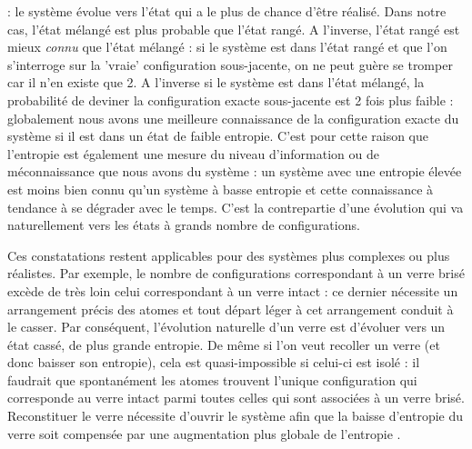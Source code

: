  : le système évolue vers l'état qui a le plus de chance d'être réalisé. Dans notre cas, l'état mélangé est plus probable que l'état rangé. A l'inverse, l'état rangé est mieux \textit{connu} que l'état mélangé : si le système est dans l'état rangé et que l'on s'interroge sur la 'vraie' configuration sous-jacente, on ne peut guère se tromper car il n'en existe que 2. A l'inverse si le système est dans l'état mélangé, la probabilité de deviner la configuration exacte sous-jacente est 2 fois plus faible : globalement nous avons une meilleure connaissance de la configuration exacte du système si il est dans un état de faible entropie. C'est pour cette raison que l'entropie est également une mesure du niveau d'information ou de méconnaissance que nous avons du système : un système avec une entropie élevée est moins bien connu qu'un système à basse entropie et cette connaissance à tendance à se dégrader avec le temps. C'est la contrepartie d'une évolution qui va naturellement vers les états à grands nombre de configurations.

Ces constatations restent applicables pour des systèmes plus complexes ou plus réalistes. Par exemple, le nombre de configurations correspondant à un verre brisé excède de très loin celui correspondant à un verre intact : ce dernier nécessite un arrangement précis des atomes et tout départ léger à cet arrangement conduit à le casser. Par conséquent, l'évolution naturelle d'un verre est d'évoluer vers un état cassé, de plus grande entropie. De même si l'on veut recoller un verre (et donc baisser son entropie), cela est quasi-impossible si celui-ci est isolé : il faudrait que spontanément les atomes trouvent l'unique configuration qui corresponde au verre intact parmi toutes celles qui sont associées à un verre brisé. Reconstituer le verre nécessite d'ouvrir le système afin que la baisse d'entropie du verre soit compensée par une augmentation plus globale de l'entropie . 

